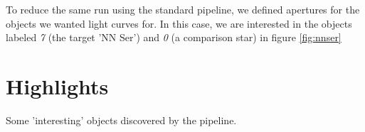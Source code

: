 To reduce the same run using the standard pipeline, we defined apertures for the objects we wanted light curves for. In this case, we are interested in the objects labeled \emph{7} (the target 'NN Ser') and \emph{0} (a comparison star) in figure \ref{fig:nnser} 

\section{Highlights}

Some 'interesting' objects discovered by the pipeline.


